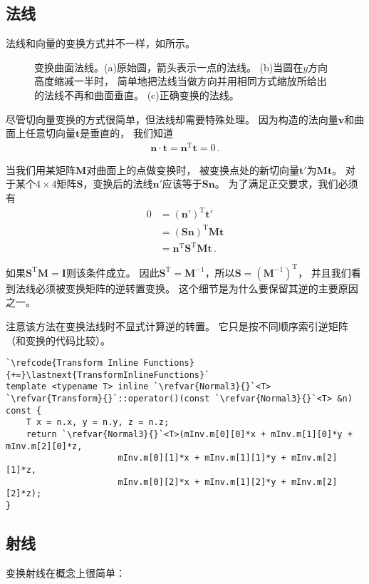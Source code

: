 \subsection{法线}\label{sub:法线}
法线和向量的变换方式并不一样，如所示。
\begin{figure}[htbp]
    \centering
    \caption{变换曲面法线。(a)原始圆，箭头表示一点的法线。
        (b)当圆在$y$方向高度缩减一半时，
        简单地把法线当做方向并用相同方式缩放所给出的法线不再和曲面垂直。
        (c)正确变换的法线。}
    \label{fig:2.14}
\end{figure}

尽管切向量变换的方式很简单，但法线却需要特殊处理。
因为构造的法向量$\bm v$和曲面上任意切向量$\bm t$是垂直的，
我们知道
\begin{align*}
    \bm n\cdot\bm t=\bm n^\mathrm{T}\bm t=0\, .
\end{align*}

当我们用某矩阵$\bm M$对曲面上的点做变换时，
被变换点处的新切向量$\bm t'$为$\bm M\bm t$。
对于某个$4\times4$矩阵$\bm S$，变换后的法线$\bm n'$应该等于$\bm S\bm n$。
为了满足正交要求，我们必须有
\begin{align*}
    0 & =(\bm n')^\mathrm{T}\bm t'                      \\
      & =(\bm S\bm n)^\mathrm{T}\bm M\bm t              \\
      & =\bm n^\mathrm{T}\bm S^\mathrm{T}\bm M\bm t\, .
\end{align*}

如果$\bm S^\mathrm{T}\bm M=\bm I$则该条件成立。
因此$\bm S^\mathrm{T}=\bm M^{-1}$，所以$\bm S=(\bm M^{-1})^\mathrm{T}$，
并且我们看到法线必须被变换矩阵的逆转置变换。
这个细节是为什么要保留其逆的主要原因之一。

注意该方法在变换法线时不显式计算逆的转置。
它只是按不同顺序索引逆矩阵（和变换的代码比较）。
\begin{lstlisting}
`\refcode{Transform Inline Functions}{+=}\lastnext{TransformInlineFunctions}`
template <typename T> inline `\refvar{Normal3}{}`<T>
`\refvar{Transform}{}`::operator()(const `\refvar{Normal3}{}`<T> &n) const {
    T x = n.x, y = n.y, z = n.z;
    return `\refvar{Normal3}{}`<T>(mInv.m[0][0]*x + mInv.m[1][0]*y + mInv.m[2][0]*z,
                      mInv.m[0][1]*x + mInv.m[1][1]*y + mInv.m[2][1]*z,
                      mInv.m[0][2]*x + mInv.m[1][2]*y + mInv.m[2][2]*z);
}
\end{lstlisting}

\subsection{射线}\label{sub:射线}
变换射线在概念上很简单：